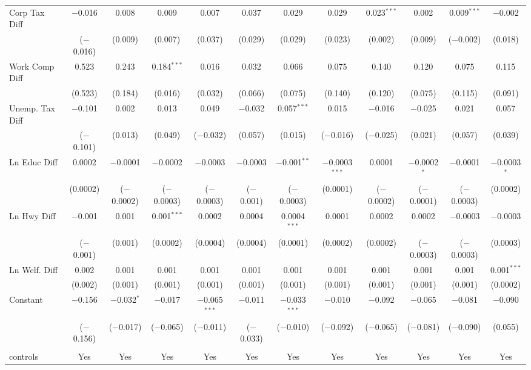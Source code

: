 \begin{table}[!htbp]
\begin{tabular}{@{\extracolsep{5pt}}lccccccccccc}
  Corp Tax Diff & $-$0.016 & 0.008 & 0.009 & 0.007 & 0.037 & 0.029 & 0.029 & 0.023$^{***}$ & 0.002 & 0.009$^{***}$ & $-$0.002 \\ 
  & ($-$0.016) & (0.009) & (0.007) & (0.037) & (0.029) & (0.029) & (0.023) & (0.002) & (0.009) & ($-$0.002) & (0.018) \\ 
  Work Comp Diff & 0.523 & 0.243 & 0.184$^{***}$ & 0.016 & 0.032 & 0.066 & 0.075 & 0.140 & 0.120 & 0.075 & 0.115 \\ 
  & (0.523) & (0.184) & (0.016) & (0.032) & (0.066) & (0.075) & (0.140) & (0.120) & (0.075) & (0.115) & (0.091) \\ 
  Unemp. Tax Diff & $-$0.101 & 0.002 & 0.013 & 0.049 & $-$0.032 & 0.057$^{***}$ & 0.015 & $-$0.016 & $-$0.025 & 0.021 & 0.057 \\ 
  & ($-$0.101) & (0.013) & (0.049) & ($-$0.032) & (0.057) & (0.015) & ($-$0.016) & ($-$0.025) & (0.021) & (0.057) & (0.039) \\ 
  Ln Educ Diff & 0.0002 & $-$0.0001 & $-$0.0002 & $-$0.0003 & $-$0.0003 & $-$0.001$^{**}$ & $-$0.0003$^{***}$ & 0.0001 & $-$0.0002$^{*}$ & $-$0.0001 & $-$0.0003$^{*}$ \\ 
  & (0.0002) & ($-$0.0002) & ($-$0.0003) & ($-$0.0003) & ($-$0.001) & ($-$0.0003) & (0.0001) & ($-$0.0002) & ($-$0.0001) & ($-$0.0003) & (0.0002) \\ 
  Ln Hwy Diff & $-$0.001 & 0.001 & 0.001$^{***}$ & 0.0002 & 0.0004 & 0.0004$^{***}$ & 0.0001 & 0.0002 & 0.0002 & $-$0.0003 & $-$0.0003 \\ 
  & ($-$0.001) & (0.001) & (0.0002) & (0.0004) & (0.0004) & (0.0001) & (0.0002) & (0.0002) & ($-$0.0003) & ($-$0.0003) & (0.0003) \\ 
  Ln Welf. Diff & 0.002 & 0.001 & 0.001 & 0.001 & 0.001 & 0.001 & 0.001 & 0.001 & 0.001 & 0.001 & 0.001$^{***}$ \\ 
  & (0.002) & (0.001) & (0.001) & (0.001) & (0.001) & (0.001) & (0.001) & (0.001) & (0.001) & (0.001) & (0.0002) \\ 
  Constant & $-$0.156 & $-$0.032$^{*}$ & $-$0.017 & $-$0.065$^{***}$ & $-$0.011 & $-$0.033$^{***}$ & $-$0.010 & $-$0.092 & $-$0.065 & $-$0.081 & $-$0.090 \\ 
  & ($-$0.156) & ($-$0.017) & ($-$0.065) & ($-$0.011) & ($-$0.033) & ($-$0.010) & ($-$0.092) & ($-$0.065) & ($-$0.081) & ($-$0.090) & (0.055) \\ 
 \hline \\[-1.8ex] 
controls & Yes & Yes & Yes & Yes & Yes & Yes & Yes & Yes & Yes & Yes & Yes \\ 

\end{tabular}
\end{table}
